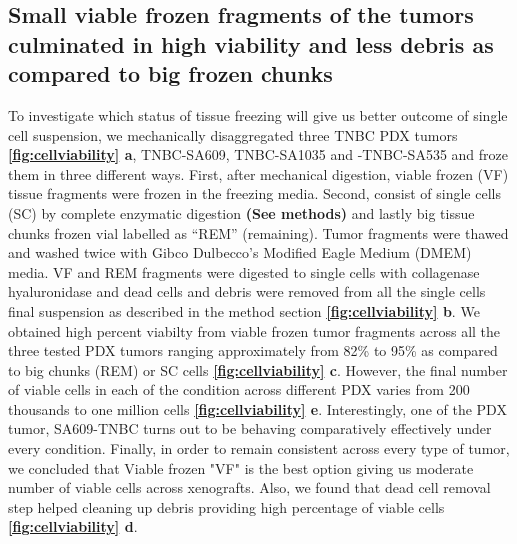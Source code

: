 \subsection{Small viable frozen fragments of the tumors culminated in high viability and less debris as compared to big frozen chunks}
To investigate which status of tissue freezing will give us better outcome of single cell suspension, we mechanically disaggregated three TNBC PDX tumors \textbf{\autoref{fig:cellviability} a}, TNBC-SA609, TNBC-SA1035 and -TNBC-SA535 and froze them in three different ways. First, after mechanical digestion, viable frozen (VF) tissue fragments were frozen in the freezing media. Second, consist of single cells (SC) by complete enzymatic digestion \textbf{(See methods)} and lastly big tissue chunks frozen vial labelled as ``REM'' (remaining). 
Tumor fragments were thawed and washed twice with 
Gibco Dulbecco's Modified Eagle Medium (DMEM) media. VF and REM fragments were digested to single cells with collagenase hyaluronidase and dead cells and debris were removed from all the single cells final suspension as described in the method section \textbf{\autoref{fig:cellviability} b}. We obtained high percent viabilty from viable frozen tumor fragments across all the three tested PDX tumors ranging approximately from 82\% to 95\% as compared to big chunks (REM) or SC cells \textbf{\autoref{fig:cellviability} c}.
However, the final number of viable cells in each of the condition across different PDX varies from 200 thousands to one million cells \textbf{\autoref{fig:cellviability} e}. Interestingly, one of the PDX tumor, SA609-TNBC turns out to be behaving comparatively effectively under every condition. 
Finally, in order to  remain consistent across every type of tumor, we concluded that Viable frozen "VF" is the best option giving us moderate number of viable cells across xenografts.
Also, we found that dead cell removal step helped cleaning up debris providing high percentage of viable cells \textbf{\autoref{fig:cellviability} d}.





